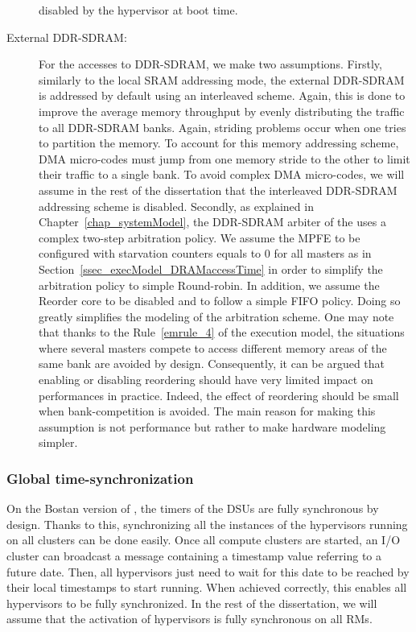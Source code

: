 \documentclass[main.tex]{subfiles}
\begin{document}
\begin{description}
        disabled by the hypervisor at boot time.
    \item[External DDR-SDRAM: ] For the accesses to DDR-SDRAM, we make two
        assumptions.  Firstly, similarly to the local SRAM addressing mode, the
        external DDR-SDRAM is addressed by default using an interleaved scheme.
        Again, this is done to improve the average memory throughput by evenly
        distributing the traffic to all DDR-SDRAM banks. Again, striding
        problems occur when one tries to partition the memory. To account for
        this memory addressing scheme, DMA micro-codes must jump from one
        memory stride to the other to limit their traffic to a single bank. To
        avoid complex DMA micro-codes, we will assume in the rest of the
        dissertation that the interleaved DDR-SDRAM addressing scheme is
        disabled.  Secondly, as explained in Chapter~\ref{chap_systemModel},
        the DDR-SDRAM arbiter of the \mppalong uses a complex two-step
        arbitration policy. We assume the MPFE to be configured with starvation
        counters equals to 0 for all masters as in
        Section~\ref{ssec_execModel_DRAMaccessTime} in order to simplify the
        arbitration policy to simple Round-robin. In addition, we assume the
        Reorder core to be disabled and to follow a simple FIFO policy. Doing
        so greatly simplifies the modeling of the arbitration scheme. One may
        note that thanks to the Rule~\ref{emrule_4} of the execution model, the
        situations where several masters compete to access different memory
        areas of the same bank are avoided by design. Consequently, it can be
        argued that enabling or disabling reordering should have very limited
        impact on performances in practice. Indeed, the effect of reordering
        should be small when bank-competition is avoided. The main reason for
        making this assumption is not performance but rather to make hardware
        modeling simpler.
\end{description}

\subsubsection{Global time-synchronization}
On the Bostan version of \mppalong, the timers of the DSUs are fully
synchronous by design.  Thanks to this, synchronizing all the instances of the
hypervisors running on all clusters can be done easily. Once all compute
clusters are started, an I/O cluster can broadcast a message containing a
timestamp value referring to a future date. Then, all hypervisors just need to
wait for this date to be reached by their local timestamps to start running.
When achieved correctly, this enables all hypervisors to be fully synchronized.
In the rest of the dissertation, we will assume that the activation of
hypervisors is fully synchronous on all RMs.
\end{document}
